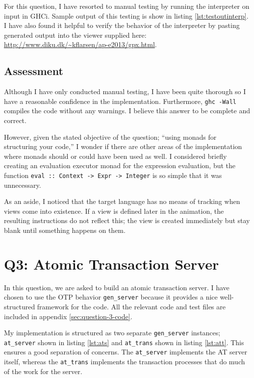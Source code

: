\documentclass[
paper=a4,
oneside,
fontsize=11pt,
numbers=noenddot,
headinclude=false, %
footinclude=false, %
fleqn,             %
DIV=8
]{scrartcl}
\begin{document}
For this question, I have resorted to manual testing by running the interpreter
on input in GHCi. Sample output of this testing is show in listing
\ref{lst:testoutinterp}. I have also found it helpful to verify the behavior of
the interpreter by pasting generated output into the viewer supplied here:
\url{http://www.diku.dk/~kflarsen/ap-e2013/gpx.html}.

\subsection{Assessment}
\label{sec:assessment-1}

Although I have only conducted manual testing, I have been quite thorough so I
have a reasonable confidence in the implementation. Furthermore, {\tt ghc -Wall}
compiles the code without any warnings. I believe this answer to be complete and
correct.

However, given the stated objective of the question; ``using monads for
structuring your code,'' I wonder if there are other areas of the implementation
where monads should or could have been used as well. I considered briefly
creating an evaluation executor monad for the expression evaluation, but the
function {\tt eval :: Context -> Expr -> Integer} is so simple that it was
unnecessary.

As an aside, I noticed that the target language has no means of tracking when
views come into existence. If a view is defined later in the animation, the
resulting instructions do not reflect this; the view is created immediately but
stay blank until something happens on them.

\clearpage
\section{Q3: Atomic Transaction Server}

In this question, we are asked to build an atomic transaction server. I have
chosen to use the OTP behavior {\tt gen\_server} because it provides a nice
well-structured framework for the code. All the relevant code and test files are
included in appendix \ref{sec:question-3-code}.


My implementation is structured as two separate {\tt gen\_server} instances; {\tt
  at\_server} shown in listing \ref{lst:ats} and {\tt at\_trans} shown in listing
\ref{lst:att}. This ensures a good separation of concerns. The {\tt at\_server}
implements the AT server itself, whereas the {\tt at\_trans} implements the
transaction processes that do much of the work for the server.
\end{document}
